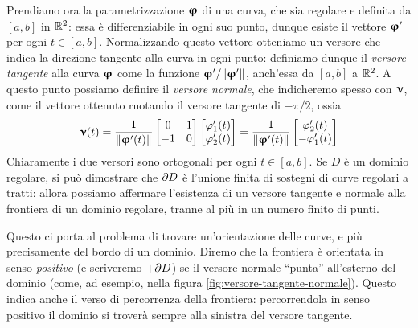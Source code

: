 Prendiamo ora la parametrizzazione $\bm{\upvarphi}$ di una curva, che sia regolare e definita da $[a,b]$ in $\mathbb{R}^2$: essa è differenziabile in ogni suo punto, dunque esiste il vettore $\bm{\upvarphi}'$ per ogni $t\in[a,b]$.
Normalizzando questo vettore otteniamo un versore che indica la direzione tangente alla curva in ogni punto: definiamo dunque il \emph{versore tangente} alla curva $\bm{\upvarphi}$ come la funzione $\bm{\upvarphi}'/\lVert\bm{\upvarphi}'\rVert$, anch'essa da $[a,b]$ a $\mathbb{R}^2$.
A questo punto possiamo definire il \emph{versore normale}, che indicheremo spesso con $\bm{\upnu}$, come il vettore ottenuto ruotando il versore tangente di $-\pi/2$, ossia
\begin{equation*}
	\bm{\upnu}(t)=\frac1{\lVert\bm{\upvarphi}'(t)\rVert}
	\begin{bmatrix}
		0&1\\-1&0
	\end{bmatrix}
	\begin{bmatrix}
		\varphi'_1(t)\\\varphi'_2(t)
	\end{bmatrix}
	=\frac1{\lVert\bm{\upvarphi}'(t)\rVert}
	\begin{bmatrix}
		\varphi'_2(t)\\-\varphi'_1(t)
	\end{bmatrix}
\end{equation*}
Chiaramente i due versori sono ortogonali per ogni $t\in[a,b]$.
Se $D$ è un dominio regolare, si può dimostrare che $\partial D$ è l'unione finita di sostegni di curve regolari a tratti: allora possiamo affermare l'esistenza di un versore tangente e normale alla frontiera di un dominio regolare, tranne al più in un numero finito di punti.

Questo ci porta al problema di trovare un'orientazione delle curve, e più precisamente del bordo di un dominio.
Diremo che la frontiera è orientata in senso \emph{positivo} (e scriveremo $+\partial D$) se il versore normale ``punta'' all'esterno del dominio (come, ad esempio, nella figura \ref{fig:versore-tangente-normale}).
Questo indica anche il verso di percorrenza della frontiera: percorrendola in senso positivo il dominio si troverà sempre alla sinistra del versore tangente.


